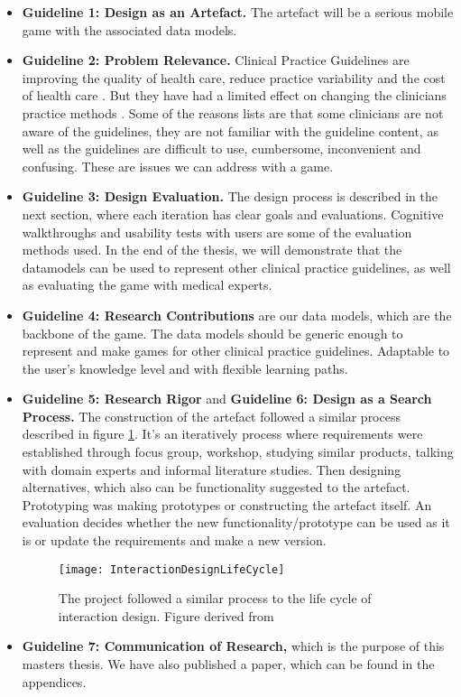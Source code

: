 \begin{itemize}
	\item \textbf{Guideline 1: Design as an Artefact.} The artefact will be a serious mobile game with the associated data models.
	\item \textbf{Guideline 2: Problem Relevance.} Clinical Practice Guidelines are improving the quality of health care, reduce practice variability and the cost of health care \parencite{DeClercq2008}. But they have had a limited effect on changing the clinicians practice methods \parencite{Cabana1999}. Some of the reasons \textcite{Cabana1999} lists are that some clinicians are not aware of the guidelines, they are not familiar with the guideline content, as well as the guidelines are difficult to use, cumbersome, inconvenient and confusing. These are issues we can address with a game.
	\item \textbf{Guideline 3: Design Evaluation.} The design process is described in the next section, where each iteration has clear goals and evaluations. Cognitive walkthroughs and usability tests with users are some of the evaluation methods used. In the end of the thesis, we will demonstrate that the datamodels can be used to represent other clinical practice guidelines, as well as evaluating the game with medical experts.
	\item \textbf{Guideline 4: Research Contributions} are our data models, which are the backbone of the game. The data models should be generic enough to represent and make games for other clinical practice guidelines. Adaptable to the user's knowledge level and with flexible learning paths.
	\item \textbf{Guideline 5: Research Rigor} and \textbf{Guideline 6: Design as a Search Process.} The construction of the artefact followed a similar process described in figure \ref{fig:InteractionDesignLifeCycle}. It's an iteratively process where requirements were established through focus group, workshop, studying similar products, talking with domain experts and informal literature studies. Then designing alternatives, which also can be functionality suggested to the artefact. Prototyping was making prototypes or constructing the artefact itself. An evaluation decides whether the new functionality/prototype can be used as it is or update the requirements and make a new version.
	
		\begin{figure}[h!]
		\caption {The project followed a similar process to the life cycle of interaction design. Figure derived from \textcite{Preece2015}}
		\label{fig:InteractionDesignLifeCycle}
		\texttt{[image: InteractionDesignLifeCycle]}
	\end{figure}
	\item \textbf{Guideline 7: Communication of Research,} which is the purpose of this masters thesis. We have also published a paper, which can be found in the appendices.
\end{itemize}


